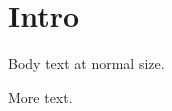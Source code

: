 \documentclass{article}
\begin{document}
\section{Intro}
Body text at normal size. \vspace{-0.5em}

More text.
\enlargethispage{2\baselineskip}
\end{document}
